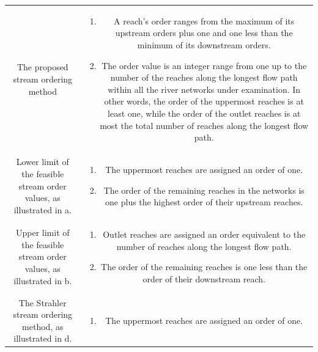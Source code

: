 \documentclass[water,article,submit,pdftex,moreauthors]{Definitions/mdpi}
\begin{document}
\begin{table}[H]
\begin{tabularx}{\textwidth}{c C}
        The proposed stream ordering method        & \begin{enumerate}
                                                         \item A reach's order ranges from the maximum of its upstream orders plus one and one less than the minimum of its downstream orders.
                                                         \item The order value is an integer range from one up to the number of the reaches along the longest flow path within all the river networks under examination. In other words, the order of the uppermost reaches is at least one, while the order of the outlet reaches is at most the total number of reaches along the longest flow path.
                                                     \end{enumerate}
        \\
        Lower limit of the feasible stream order values,
        as illustrated in a. & \begin{enumerate}
                                                         \item The uppermost reaches are assigned an order of one.
                                                         \item The order of the remaining reaches in the networks is one plus the highest order of their upstream reaches.
                                                     \end{enumerate}
        \\
        Upper limit of the feasible stream order values,
        as illustrated in b. & \begin{enumerate}
                                                         \item Outlet reaches are assigned an order equivalent to the number of reaches along the longest flow path.
                                                         \item The order of the remaining reaches is one less than the order of their downstream reach.
                                                     \end{enumerate}
        \\
        The Strahler stream ordering method,
        as illustrated in d. & \begin{enumerate}
                                                         \item The uppermost reaches are assigned an order of one.

\end{enumerate}
\end{tabularx}
\end{table}
\end{document}

